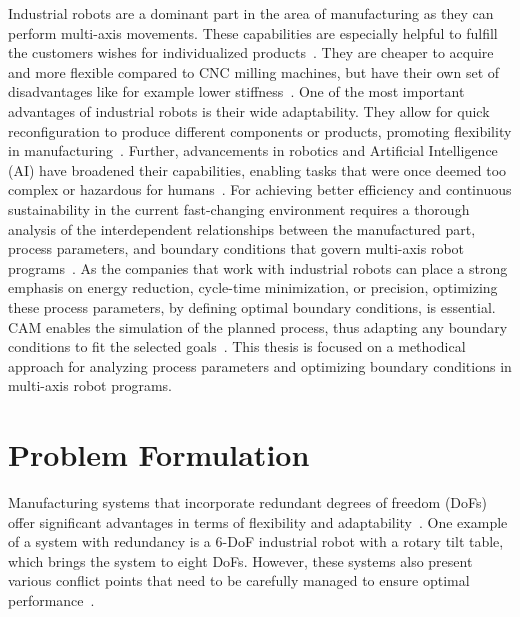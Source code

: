 Industrial robots are a dominant part in the area of manufacturing as they can perform multi-axis movements. These capabilities are especially helpful to fulfill the customers wishes for individualized products~\cite{Sherwani.2020}. They are cheaper to acquire and more flexible compared to \acrshort{CNC} milling machines, but have their own set of disadvantages like for example lower stiffness~\cite{Iglesias.2015, Liberman.2021}. One of the most important advantages of industrial robots is their wide adaptability. They allow for quick reconfiguration to produce different components or products, promoting flexibility in manufacturing~\cite{Billard.2019}. Further, advancements in robotics and Artificial Intelligence (\acrshort{AI}) have broadened their capabilities, enabling tasks that were once deemed too complex or hazardous for humans~\cite{Goel.2020}. 
For achieving better efficiency and continuous sustainability in the current fast-changing environment requires a thorough analysis of the interdependent relationships between the manufactured part, process parameters, and boundary conditions that govern multi-axis robot programs~\cite{Pan, Gadaleta.2019}. As the companies that work with industrial robots can place a strong emphasis on energy reduction, cycle-time minimization, or precision, optimizing these process parameters, by defining optimal boundary conditions, is essential. \acrshort{CAM} enables the simulation of the planned process, thus adapting any boundary conditions to fit the selected goals~\cite{Kyratsis.2020,Maiti.2017,Pan,Uhlmann.2016}.
This thesis is focused on a methodical approach for analyzing process parameters and optimizing boundary conditions in multi-axis robot programs. 

\section{Problem Formulation}\label{Problem Formulation}
Manufacturing systems that incorporate redundant degrees of freedom (\acrshort{DoF}s) offer significant advantages in terms of flexibility and adaptability~\cite{Anjum.2022}. One example of a system with redundancy is a 6-\acrshort{DoF} industrial robot with a rotary tilt table, which brings the system to eight \acrshort{DoF}s. However, these systems also present various conflict points that need to be carefully managed to ensure optimal performance~\cite{Boscariol.2020}.


